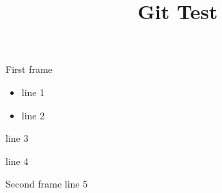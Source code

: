 \documentclass[10pt]{beamer}
\begin{document}
	
	\title{Git Test}
	\frame{\titlepage}
	

\begin{frame}{First frame}

\begin{minipage}{.5\textwidth}
	\begin{itemize}
		\item line 1
		\item line 2
	\end{itemize}
\end{minipage}
\begin{minipage}{.4\textwidth}
	line 3
	\begin{block}{}
		line 4
	\end{block}
\end{minipage}

\end{frame}

\begin{Frame}{Second frame}
	line 5
\end{Frame}
\end{document}
